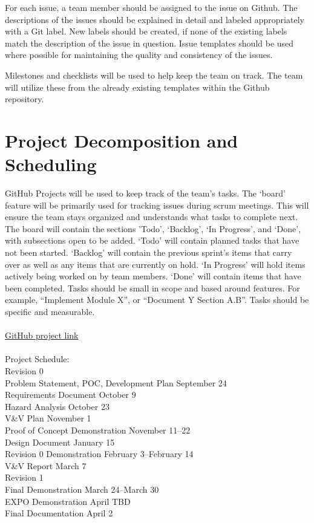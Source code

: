 \documentclass{article}
\begin{document}
For each issue, a team member should be assigned to the issue on Github. The descriptions
of the issues should be explained in detail and labeled appropriately with a Git label. New labels
should be created, if none of the existing labels match the description of the issue in question.
Issue templates should be used where possible for maintaining the quality and consistency of the
issues.\newline

Milestones and checklists will be used to help keep the team on track. The team will
utilize these from the already existing templates within the Github repository.

\section{Project Decomposition and Scheduling}

GitHub Projects will be used to keep track of the team’s tasks. The ‘board’ feature will be primarily used for tracking issues during scrum meetings. This will ensure the team stays organized and understands what tasks to complete next.
The board will contain the sections ’Todo’, ‘Backlog’, ‘In Progress’, and ‘Done’, with subsections open to be added. ‘Todo’ will contain planned tasks that have not been started. ‘Backlog’ will contain the previous sprint’s items that carry over as well as any items that are currently on hold. ‘In Progress’ will hold items actively being worked on by team members. ‘Done’ will contain items that have been completed.
Tasks should be small in scope and based around features. For example, “Implement Module X”, or “Document Y Section A.B”. Tasks should be specific and measurable.
\\\\
\href{https://github.com/users/saltA-saurus/projects/5}{GitHub project link}
\\\\
Project Schedule:\\
\indent Revision 0\\
\indent Problem Statement, POC, Development Plan \hfill September 24\\
\indent Requirements Document \hfill October 9\\
\indent Hazard Analysis \hfill October 23\\
\indent V\&V Plan \hfill November 1\\
\indent Proof of Concept Demonstration \hfill November 11--22\\
\indent Design Document \hfill January 15\\
\indent Revision 0 Demonstration \hfill February 3--February 14\\
\indent V\&V Report \hfill March 7\\
\indent Revision 1\\
\indent Final Demonstration \hfill March 24--March 30\\
\indent EXPO Demonstration \hfill April TBD\\
\indent Final Documentation \hfill April 2\\
\end{document}
